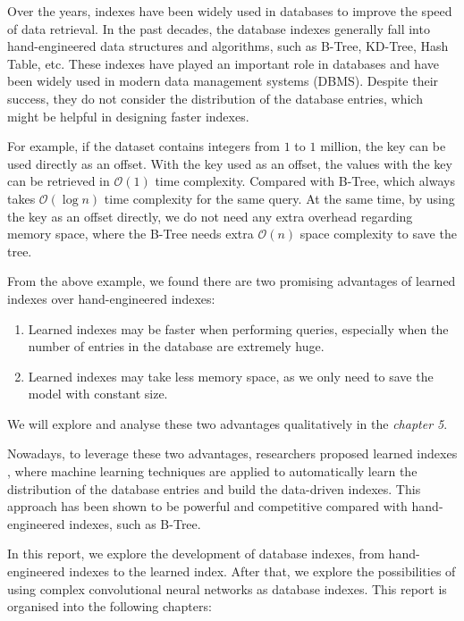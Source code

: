 Over the years, indexes have been widely used in databases to improve the speed of data retrieval. In the past decades, the database indexes generally fall into hand-engineered data structures and algorithms, such as B-Tree, KD-Tree, Hash Table, etc. These indexes have played an important role in databases and have been widely used in modern data management systems (DBMS). Despite their success, they do not consider the distribution of the database entries, which might be helpful in designing faster indexes.

For example, if the dataset contains integers from $1$ to $1$ million, the key can be used directly as an offset. With the key used as an offset, the values with the key can be retrieved in $\mathcal{O}(1)$ time complexity. Compared with B-Tree, which always takes $\mathcal{O}(\log n)$ time complexity for the same query. At the same time, by using the key as an offset directly, we do not need any extra overhead regarding memory space, where the B-Tree needs extra $\mathcal{O}(n)$ space complexity to save the tree.

From the above example, we found there are two promising advantages of learned indexes over hand-engineered indexes:
\begin{enumerate}
  \item Learned indexes may be faster when performing queries, especially when the number of entries in the database are extremely huge.
  \item Learned indexes may take less memory space, as we only need to save the model with constant size.
  \end{enumerate}
  
 We will explore and analyse these two advantages qualitatively in the \textit{chapter 5}. 

Nowadays, to leverage these two advantages, researchers proposed learned indexes \cite{kraska2018case}, where machine learning techniques are applied to automatically learn the distribution of the database entries and build the data-driven indexes. This approach has been shown to be powerful and competitive compared with hand-engineered indexes, such as B-Tree.

In this report, we explore the development of database indexes, from hand-engineered indexes to the learned index. After that, we explore the possibilities of using complex convolutional neural networks as database indexes. This report is organised into the following chapters:

